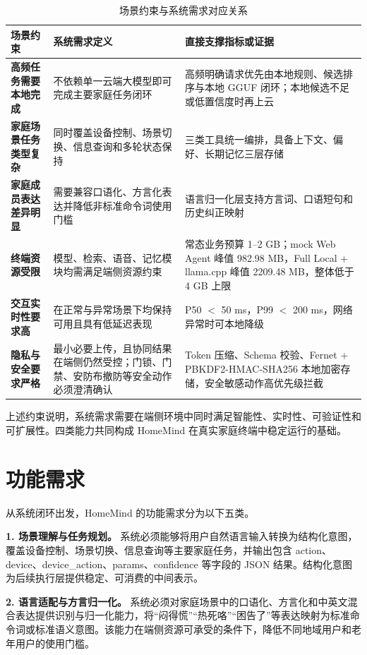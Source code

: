 \documentclass[12pt,a4paper,oneside]{ctexrep}
\begin{document}
\begin{table}[H]
    \centering
    \caption{场景约束与系统需求对应关系}
    \begin{tabularx}{\textwidth}{>{\bfseries}p{3.2cm}X X}
        \toprule
        场景约束 & 系统需求定义 & 直接支撑指标或证据 \\
        \midrule
        高频任务需要本地完成 & 不依赖单一云端大模型即可完成主要家庭任务闭环 & 高频明确请求优先由本地规则、候选排序与本地 GGUF 闭环；本地候选不足或低置信度时再上云 \\
        家庭场景任务类型复杂 & 同时覆盖设备控制、场景切换、信息查询和多轮状态保持 & 三类工具统一编排，具备上下文、偏好、长期记忆三层存储 \\
        家庭成员表达差异明显 & 需要兼容口语化、方言化表达并降低非标准命令词使用门槛 & 语言归一化层支持方言词、口语短句和历史纠正映射 \\
        终端资源受限 & 模型、检索、语音、记忆模块均需满足端侧资源约束 & 常态业务预算 1--2 GB；mock Web Agent 峰值 982.98 MB，Full Local + llama.cpp 峰值 2209.48 MB，整体低于 4 GB 上限 \\
        交互实时性要求高 & 在正常与异常场景下均保持可用且具有低延迟表现 & P50 $<$ 50 ms，P99 $<$ 200 ms，网络异常时可本地降级 \\
        隐私与安全要求严格 & 最小必要上传，且协同结果在端侧仍然受控；门锁、门禁、安防布撤防等安全动作必须澄清确认 & Token 压缩、Schema 校验、Fernet + PBKDF2-HMAC-SHA256 本地加密存储，安全敏感动作高优先级拦截 \\
        \bottomrule
    \end{tabularx}
\end{table}

上述约束说明，系统需求需要在端侧环境中同时满足智能性、实时性、可验证性和可扩展性。四类能力共同构成 HomeMind 在真实家庭终端中稳定运行的基础。

\section{功能需求}

从系统闭环出发，HomeMind 的功能需求分为以下五类。

\textbf{1. 场景理解与任务规划。} 系统必须能够将用户自然语言输入转换为结构化意图，覆盖设备控制、场景切换、信息查询等主要家庭任务，并输出包含 action、device、device\_action、params、confidence 等字段的 JSON 结果。结构化意图为后续执行层提供稳定、可消费的中间表示。

\textbf{2. 语言适配与方言归一化。} 系统必须对家庭场景中的口语化、方言化和中英文混合表达提供识别与归一化能力，将“闷得慌”“热死咯”“困告了”等表达映射为标准命令词或标准语义意图。该能力在端侧资源可承受的条件下，降低不同地域用户和老年用户的使用门槛。
\end{document}
